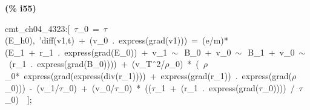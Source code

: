 \documentclass[fleqn]{article}
\begin{document}
\noindent
\begin{minipage}[t]{4.000000em}\color{red}\bfseries
(\% i55)	
\end{minipage}
\begin{minipage}[t]{\textwidth}\color{blue}
cmt\_ch04\_4323:[\ \ensuremath{\tau}\_0\ =\ \ensuremath{\tau}(E\_h0),\ 'diff(v1,t)\ +\ (v\_0\ .\ express(grad(v1)))\ =\ (e/m)*(E\_1\ +\ r\_1\ .\ express(grad(E\_0))\ +\ v\_1\ \ensuremath{\sim\ }\ B\_0\ +\ v\_0\ \ensuremath{\sim\ }\ B\_1\ +\ v\_0\ \ensuremath{\sim\ }\ (r\_1\ .\ express(grad(B\_0))))\ +\ (v\_T\^\ 2/\ensuremath{\rho}\_0)\ *\ (\ \ensuremath{\rho}\_0*\ express(grad(express(div(r\_1))))\ +\ express(grad(r\_1))\ .\ express(grad(\ensuremath{\rho}\_0)))\ -\ (v\_1/\ensuremath{\tau}\_0)\ +\ (v\_0/\ensuremath{\tau}\_0)\ *\ ((\ensuremath{\tau}\_1\ +\ (r\_1\ .\ express(grad(\ensuremath{\tau}\_0))))\ /\ \ensuremath{\tau}\_0)\ \ ];
\end{minipage}
\end{document}
